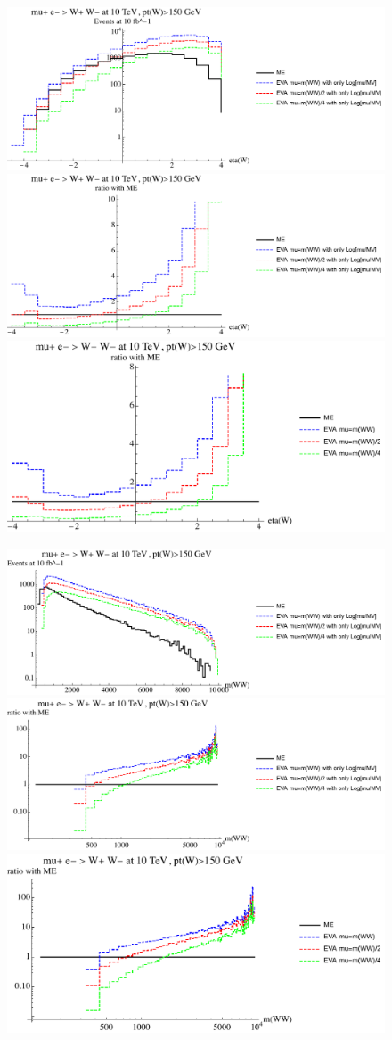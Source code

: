 \documentclass[a4paper,11pt]{article}
\begin{document}
\begin{figure}[ht]
\includegraphics[width=0.46\linewidth]{Notebooks/PlotDistr/WW_WW/10TeVolnlyptcut/plotetaW.pdf}
\includegraphics[width=0.46\linewidth]{Notebooks/PlotDistr/WW_WW/10TeVolnlyptcut/plotetaWratio1.pdf}
\includegraphics[width=0.46\linewidth]{Notebooks/PlotDistr/WW_WW/10TeVolnlyptcut/plotetaWratio2.pdf}
\end{figure}

\begin{figure}[ht]
\includegraphics[width=0.46\linewidth]{Notebooks/PlotDistr/WW_WW/10TeVolnlyptcut/plotmWW.pdf}
\includegraphics[width=0.46\linewidth]{Notebooks/PlotDistr/WW_WW/10TeVolnlyptcut/plotmWWratio1.pdf}
\includegraphics[width=0.46\linewidth]{Notebooks/PlotDistr/WW_WW/10TeVolnlyptcut/plotmWWratio2.pdf}
\end{figure}
\end{document}
